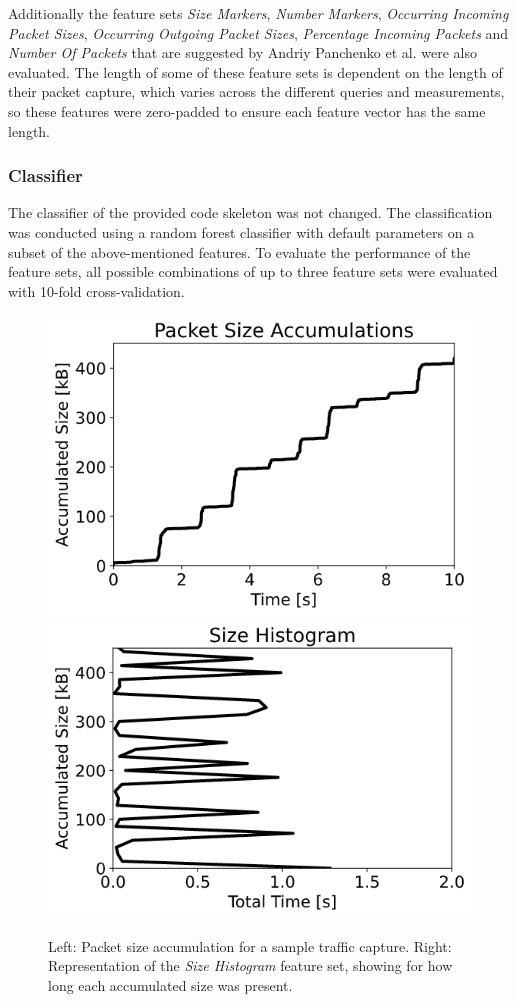 \documentclass[9pt,conference]{IEEEtran}
\begin{document}
Additionally the feature sets \textit{Size Markers}, \textit{Number Markers}, \textit{Occurring Incoming Packet Sizes}, \textit{Occurring Outgoing Packet Sizes}, \textit{Percentage Incoming Packets} and \textit{Number Of Packets} that are suggested by Andriy Panchenko et al.\cite{panchenko2011website} were also evaluated. The length of some of these feature sets is dependent on the length of their packet capture, which varies across the different queries and measurements, so these features were zero-padded to ensure each feature vector has the same length.

\subsubsection{Classifier}
The classifier of the provided code skeleton was not changed. The classification was conducted using a random forest classifier with default parameters\cite{skleran_random_forest} on a subset of the above-mentioned features. To evaluate the performance of the feature sets, all possible combinations of up to three feature sets were evaluated with 10-fold cross-validation.

\begin{figure}
    \centering
    \includegraphics[width=0.45\linewidth]{images/size_accums.png}
    \includegraphics[width=0.45\linewidth]{images/histogram.png}
    \caption{Left: Packet size accumulation for a sample traffic capture. Right: Representation of the \textit{Size Histogram} feature set, showing for how long each accumulated size was present.}
    \label{fig:features}
\end{figure}
\end{document}
